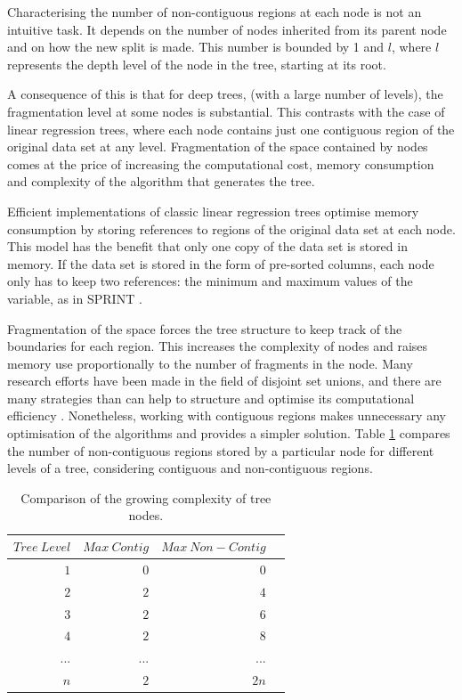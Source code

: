 \documentclass[times,twocolumn,final,authoryear]{elsarticle}
\begin{document}
Characterising the number of non-contiguous regions at each node is not an intuitive task. It depends on the number of nodes inherited from its parent node and on how the new split is made. This number is bounded by 1 and $l$, where $l$ represents the depth level of the node in the tree, starting at its root.

A consequence of this is that for deep trees, (with a large number of levels), the fragmentation level at some nodes is substantial. This contrasts with the case of linear regression trees, where each node contains just one contiguous region of the original data set at any level. Fragmentation of the space contained by nodes comes at the price of increasing the computational cost, memory consumption and complexity of the algorithm that generates the tree.

Efficient implementations of classic linear regression trees optimise memory consumption by storing references to regions of the original data set at each node. This model has the benefit that only one copy of the data set is stored in memory. If the data set is stored in the form of pre-sorted columns, each node only has to keep two references: the minimum and maximum values of the variable, as in SPRINT \citep{Shareretal1996}.

Fragmentation of the space forces the tree structure to keep track of the boundaries for each region. This increases the complexity of nodes and raises memory use proportionally to the number of fragments in the node. Many research efforts have been made in the field of disjoint set unions, and there are many strategies than can help to structure and optimise its computational efficiency \citep{Galil1991}. Nonetheless, working with contiguous regions makes unnecessary any optimisation of the algorithms and provides a simpler solution. Table \ref{t1} compares the number of non-contiguous regions stored by a particular node for different levels of a tree, considering contiguous and non-contiguous regions.

\begin{table}[t]
\caption{Comparison of the growing complexity of tree nodes.}\label{t1}
\begin{center}
\begin{tabular}{rrrr}
\hline\hline
$Tree\ Level$ & $Max\ Contig$ & $Max\ Non-Contig$\\
\hline
$1$ & $0$ & $0$\\
$2$ & $2$ & $4$\\
$3$ & $2$ & $6$\\
$4$ & $2$ & $8$\\
... & ... & ...\\
$n$ & $2$ & $2n$\\

\hline
\end{tabular}
\end{center}
\end{table}
\end{document}
